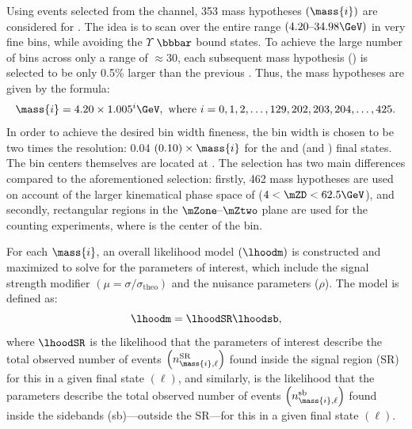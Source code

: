 Using events selected from the \htozzd channel, 353 mass hypotheses $\left( \mass{i} \right)$ are considered for \mZtwo.
The idea is to scan over the entire \mZtwo range $(4.20\text{--}34.98 \GeV)$ in very fine \mZtwo bins, while avoiding the $\varUpsilon$ $\bbbar$ bound states.  %
To achieve the large number of bins across only a range of $\approx$30\GeV, each subsequent mass hypothesis () is selected to be only 0.5\% larger than the previous .
Thus, the mass hypotheses are given by the formula:
\begin{align*}
    \mass{i} = 4.20 \times 1.005^{i} \GeV,
    \text{ where } i = 0,1,2, \ldots, 129, 202, 203, 204, \ldots, 425.
\end{align*}
In order to achieve the desired bin width fineness, the bin width is chosen to be two times the \mZtwo resolution:
0.04 $(0.10) \times \mass{i}$ for the \fourmu and \twoetwomu (\foure and \twomutwoe) final states.
The bin centers themselves are located at .
The \zdzd selection has two main differences compared to the aforementioned \zzd selection:
firstly, 462 mass hypotheses are used on account of the larger kinematical phase space of \mZtwo ($4 < \mZD < 62.5\GeV$),
and secondly, rectangular regions in the $\mZone \text{--} \mZtwo$ plane are used for the counting experiments, where  is the center of the bin.

For each $\mass{i}$, an overall likelihood model $(\lhoodm)$ is constructed and maximized to solve for the parameters of interest, which include the signal strength modifier $\left( \mu = \sigma / \sigma_\text{theo} \right)$ and the nuisance parameters ($\rho$).
The model is defined as:
\begin{equation*}
    \lhoodm =
    \lhoodSR %
    \lhoodsb, %
\end{equation*}
where $\lhoodSR$ is the likelihood that the parameters of interest describe the total observed number of events $\left( n^\text{SR}_{\mass{i}, \ell} \right)$ found inside the signal region (SR) for this  in a given final state $(\ell)$,
and similarly, \lhoodsb is the likelihood that the parameters describe the total observed number of events $\left( n^\text{sb}_{\mass{i}, \ell} \right)$ found inside the sidebands (sb)---\ie outside the SR---for this  in a given final state $(\ell)$.

